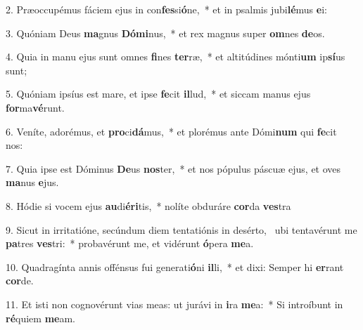 2. Præoccupémus fáciem ejus in con\textbf{fes}si\textbf{ó}ne,~*  et in psalmis jubi\textbf{lé}mus \textbf{e}i:\

3. Quóniam Deus \textbf{ma}gnus \textbf{Dó}\textbf{mi}nus,~*  et rex magnus super \textbf{om}nes \textbf{de}os.\

4. Quia in manu ejus sunt omnes \textbf{fi}nes \textbf{ter}ræ,~*  et altitúdines mónti\textbf{um} ip\textbf{sí}us sunt;\

5. Quóniam ipsíus est mare, et ipse \textbf{fe}cit \textbf{il}lud,~*  et siccam manus ejus \textbf{for}ma\textbf{vé}runt.\

6. Veníte, adorémus, et \textbf{pro}ci\textbf{dá}mus,~*  et plorémus ante Dómi\textbf{num} qui \textbf{fe}cit nos:\

7. Quia ipse est Dóminus \textbf{De}us \textbf{nos}ter,~*  et nos pópulus páscuæ ejus, et oves \textbf{ma}nus \textbf{e}jus.\

8. Hódie si vocem ejus \textbf{au}di\textbf{é}\textbf{ri}tis,~*  nolíte obduráre \textbf{cor}da \textbf{ves}tra\

9. Sicut in irritatióne, secúndum diem tentatiónis in desérto, \dag\  ubi tentavérunt me \textbf{pa}tres \textbf{ves}tri:~*  probavérunt me, et vidérunt \textbf{ó}pera \textbf{me}a.\

10. Quadragínta annis offénsus fui generati\textbf{ó}ni \textbf{il}li,~*  et dixi: Semper hi \textbf{er}rant \textbf{cor}de.\

11. Et isti non cognovérunt vias meas: ut jurávi in \textbf{i}ra \textbf{me}a:~*  Si introíbunt in \textbf{ré}quiem \textbf{me}am.\

